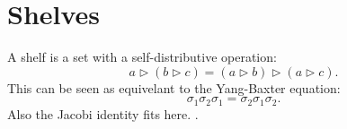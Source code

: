 \documentclass[11pt]{article}
\begin{document}

\section{Shelves}

A shelf is a set with a self-distributive operation:
$$
a \triangleright (b \triangleright c) = (a\triangleright b)\triangleright(a\triangleright c).
$$
This can be seen as equivelant to the Yang-Baxter equation:
$$\sigma_1 \sigma_2 \sigma_1 = \sigma_2 \sigma_1 \sigma_2.$$
Also the Jacobi identity fits here.
\cite{Crans2004,Dehornoy2012}.













\end{document}
